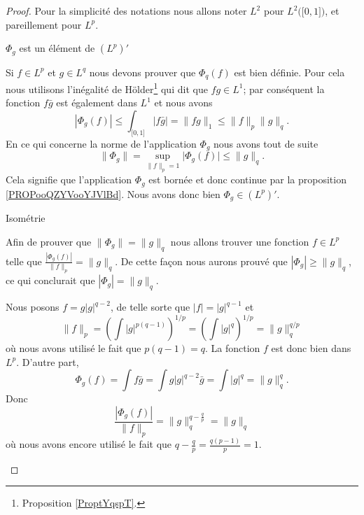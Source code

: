 \begin{proof}
    Pour la simplicité des notations nous allons noter \( L^2\) pour \( L^2\big( \mathopen[ 0 , 1 \mathclose] \big)\), et pareillement pour \( L^p\).
    \begin{subproof}
        \item[\( \Phi_g\) est un élément de \( (L^p)'\)]

            Si \( f\in L^p\) et \( g\in L^q\) nous devons prouver que \( \Phi_q(f)\) est bien définie. Pour cela nous utilisons l'inégalité de Hölder\footnote{Proposition \ref{ProptYqspT}.} qui dit que \( fg\in L^1\); par conséquent la fonction \( f\bar g\) est également dans \( L^1\) et nous avons
            \begin{equation}
                | \Phi_g(f) |\leq\int_{\mathopen[ 0 , 1 \mathclose]}| f\bar g |=\| fg \|_1\leq \| f \|_p\| g \|_q.
            \end{equation}
            En ce qui concerne la norme de l'application \( \Phi_g\) nous avons tout de suite
            \begin{equation}
                \| \Phi_g \|=\sup_{\| f\|_p=1}\big| \Phi_g(f) \big|\leq \| g \|_q.
            \end{equation}
            Cela signifie que l'application \( \Phi_g\) est bornée et donc continue par la proposition \ref{PROPooQZYVooYJVlBd}. Nous avons donc bien \( \Phi_g\in (L^p)'\).

        \item[Isométrie]

            Afin de prouver que \( \| \Phi_g \|=\| g \|_q\) nous allons trouver une fonction \( f\in L^p\) telle que \( \frac{ | \Phi_g(f) | }{ \| f \|_p }=\| g \|_q\).  De cette façon nous aurons prouvé que \( | \Phi_g |\geq \| g \|_q\), ce qui conclurait que \( | \Phi_g |=\| g \|_q\).

            Nous posons \( f=g| g |^{q-2}\), de telle sorte que \( | f |=| g |^{q-1}\) et
            \begin{equation}
                \| f \|_p=\left( \int| g |^{p(q-1)} \right)^{1/p}=\left( \int | g |^q \right)^{1/p}=\| g \|_q^{q/p}
            \end{equation}
            où nous avons utilisé le fait que \( p(q-1)=q\). La fonction \( f\) est donc bien dans \( L^p\). D'autre part,
            \begin{equation}
                \Phi_g(f)=\int f\bar g=\int g| g |^{q-2}\bar g=\int | g |^q=\| g \|_q^q.
            \end{equation}
            Donc
            \begin{equation}
                \frac{ | \Phi_g(f) | }{ \| f \|_p }=\| g \|_q^{q-\frac{ q }{ p }}=\| g \|_q
            \end{equation}
            où nous avons encore utilisé le fait que \( q-\frac{ q }{ p }=\frac{ q(p-1) }{ p }=1\).


\end{subproof}
\end{proof}
